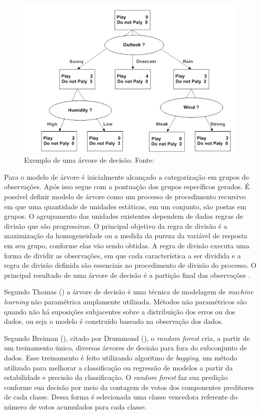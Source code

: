 \begin{figure}[H]
    \centering
    \includegraphics[scale=0.4]{figuras/referencial_teorico/arvore_decisao.png}
    \caption[Exemplo de uma árvore de decisão]{Exemplo de uma árvore de decisão. Fonte: \cite{Amal}}
    \label{fig:arvore_decisao}
\end{figure}

Para o modelo de árvore é inicialmente alcançado a categorização em grupos de observações. Após isso segue com a pontuação dos grupos específicos gerados. É possível definir modelo de árvore como um processo de procedimento recursivo em que uma quantidade de unidades estáticas, em um conjunto, são postas em grupos. O agrupamento das unidades existentes dependem de dadas regras de divisão que são progressivas. O principal objetivo da regra de divisão é a maximização da homogeneidade ou a medida da pureza da variável de resposta em seu grupo, conforme elas vão sendo obtidas. A regra de divisão executa uma forma de dividir as observações, em que cada característica a ser dividida e a regra de divisão definida são essenciais no procedimento de divisão do processo. O principal resultado de uma árvore de decisão é a partição final das observações \cite{Amal}. 

Segundo Thomas (\citeyear{Thomas:2017}) a árvore de decisão é uma técnica de modelagem de \textit{machine learning} não paramétrica amplamente utilizada. Métodos não paramétricos são quando não há suposições subjacentes sobre a distribuição dos erros ou dos dados, ou seja o modelo é construído baseado na observação dos dados.

Segundo Breiman (\citeyear{Breiman:2001:RF:570181.570182}), citado por Drummond (\citeyear{Drummond:2017}), o \textit{random forest} cria, a partir de um treinamento único, diversas árvores de decisão para fora do subconjunto de dados. Esse treinamento é feito utilizando algoritmo de \textit{bagging}, um método utilizado para melhorar a classificação ou regressão de modelos a partir da estabilidade e precisão da classificação. O \textit{random forest} faz sua predição conforme sua decisão por meio da contagem de votos dos componentes preditores de cada classe. Dessa forma é selecionada uma classe vencedora referente do número de votos acumulados para cada classe.

